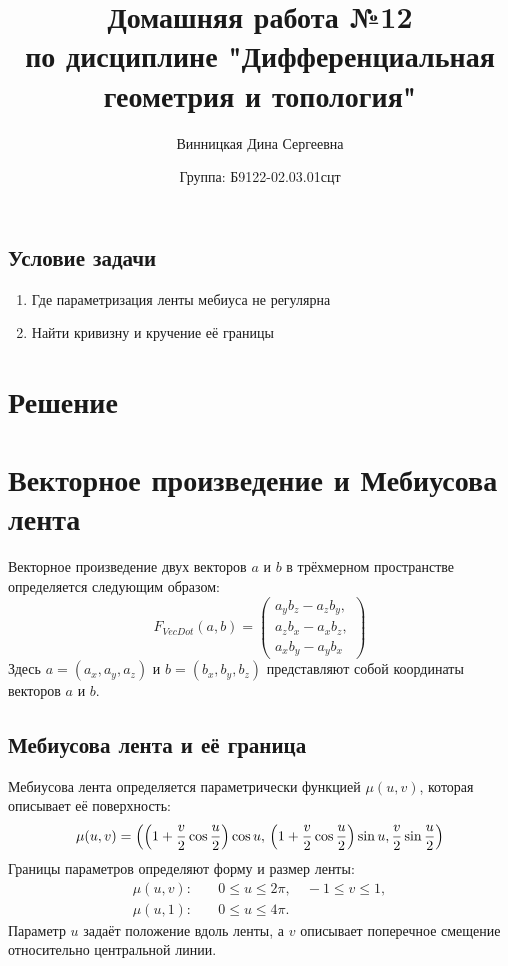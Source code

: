 \documentclass{article}
\title{\vspace{-1cm}Домашняя работа №12 \\ по дисциплине "Дифференциальная геометрия и топология"}
\author{Винницкая Дина Сергеевна}
\date{Группа: Б9122-02.03.01сцт}
\begin{document}
	
	\maketitle
       

        \subsection*{Условие задачи}
        \begin{enumerate}
            \item Где параметризация ленты мебиуса не регулярна
            \item Найти кривизну и кручение её границы
        \end{enumerate}
        \section*{Решение}

        \section*{Векторное произведение и Мебиусова лента}
        Векторное произведение двух векторов $a$ и $b$ в трёхмерном пространстве определяется следующим образом:
        \[
        F_{VecDot}(a, b) = \begin{pmatrix}
            a_y b_z - a_z b_y, \\
            a_z b_x - a_x b_z, \\
            a_x b_y - a_y b_x
        \end{pmatrix}
        \]
        Здесь $a = (a_x, a_y, a_z)$ и $b = (b_x, b_y, b_z)$ представляют собой координаты векторов $a$ и $b$.
        
        \subsection*{Мебиусова лента и её граница}
        Мебиусова лента определяется параметрически функцией $\mu(u, v)$, которая описывает её поверхность:
        \[
        \mu(u, v) = \left(
        \left( 1 + \frac{v}{2} \cos{\frac{u}{2}} \right) \cos{u}, \\
        \left( 1 + \frac{v}{2} \cos{\frac{u}{2}} \right) \sin{u}, \\
        \frac{v}{2} \sin{\frac{u}{2}}
        \right)
        \]
        Границы параметров определяют форму и размер ленты:
        \[
        \begin{aligned}
            \mu(u, v): & \quad 0 \leq u \leq 2\pi, \quad -1 \leq v \leq 1, \\
            \mu(u, 1): & \quad 0 \leq u \leq 4\pi.
        \end{aligned}
        \]
        Параметр $u$ задаёт положение вдоль ленты, а $v$ описывает поперечное смещение относительно центральной линии.
        
\end{document}
